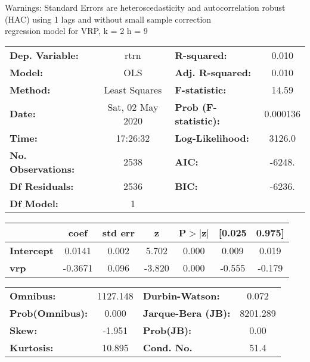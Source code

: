 Warnings: \newline
 [1] Standard Errors are heteroscedasticity and autocorrelation robust (HAC) using 1 lags and without small sample correction\\ 

regression model for VRP, k = 2 h = 9\begin{center}
\begin{tabular}{lclc}
\toprule
\textbf{Dep. Variable:}    &       rtrn       & \textbf{  R-squared:         } &     0.010   \\
\textbf{Model:}            &       OLS        & \textbf{  Adj. R-squared:    } &     0.010   \\
\textbf{Method:}           &  Least Squares   & \textbf{  F-statistic:       } &     14.59   \\
\textbf{Date:}             & Sat, 02 May 2020 & \textbf{  Prob (F-statistic):} &  0.000136   \\
\textbf{Time:}             &     17:26:32     & \textbf{  Log-Likelihood:    } &    3126.0   \\
\textbf{No. Observations:} &        2538      & \textbf{  AIC:               } &    -6248.   \\
\textbf{Df Residuals:}     &        2536      & \textbf{  BIC:               } &    -6236.   \\
\textbf{Df Model:}         &           1      & \textbf{                     } &             \\
\bottomrule
\end{tabular}
\begin{tabular}{lcccccc}
                   & \textbf{coef} & \textbf{std err} & \textbf{z} & \textbf{P$> |$z$|$} & \textbf{[0.025} & \textbf{0.975]}  \\
\midrule
\textbf{Intercept} &       0.0141  &        0.002     &     5.702  &         0.000        &        0.009    &        0.019     \\
\textbf{vrp}       &      -0.3671  &        0.096     &    -3.820  &         0.000        &       -0.555    &       -0.179     \\
\bottomrule
\end{tabular}
\begin{tabular}{lclc}
\textbf{Omnibus:}       & 1127.148 & \textbf{  Durbin-Watson:     } &    0.072  \\
\textbf{Prob(Omnibus):} &   0.000  & \textbf{  Jarque-Bera (JB):  } & 8201.289  \\
\textbf{Skew:}          &  -1.951  & \textbf{  Prob(JB):          } &     0.00  \\
\textbf{Kurtosis:}      &  10.895  & \textbf{  Cond. No.          } &     51.4  \\
\bottomrule
\end{tabular}
\end{center}

